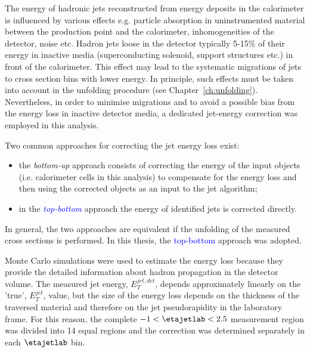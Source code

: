 The energy of hadronic jets reconstructed from energy deposits in the calorimeter is influenced by various effects e.g. particle absorption in uninstrumented material between the production point and the calorimeter, inhomogeneities of the detector, noise etc. Hadron jets loose in the \zeus detector typically 5-15\% of their energy in inactive media (superconducting solenoid, support structures etc.) in front of the calorimeter. This effect may lead to the systematic migrations of jets to cross section bins with lower energy. In principle, such effects must be taken into account in the unfolding procedure (see Chapter~\ref{ch:unfolding}). Nevertheless, in order to minimise migrations and to avoid a possible bias from the energy loss in inactive detector media, a dedicated jet-energy correction was employed in this analysis.

Two common approaches for correcting the jet energy loss exist:
\begin{itemize}
 \item the \emph{bottom-up} approach consists of correcting the energy of the input objects (i.e. calorimeter cells in this analysis) to compensate for the energy loss and then using the corrected objects as an input to the jet algorithm;
 \item in the \textcolor{blue}{\emph{top-bottom}} approach the energy of identified jets is corrected directly.
\end{itemize}
In general, the two approaches are equivalent if the unfolding of the measured cross sections is performed. In this thesis, the \textcolor{blue}{top-bottom} approach was adopted.

Monte Carlo simulations were used to estimate the energy loss because they provide the detailed information about hadron propagation in the detector volume. The measured jet energy, $E_T^{jet,det}$, depends approximately linearly on the 'true', $E_T^{jet}$, value, but the size of the energy loss depends on the thickness of the traversed material and therefore on the jet pseudorapidity in the laboratory frame. For this reason, the complete $-1<\etajetlab<2.5$ measurement region was divided into 14 equal regions and the correction was determined separately in each $\etajetlab$ bin.

